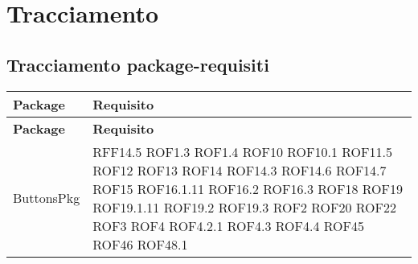 \newpage

\section{Tracciamento}

	\subsection{Tracciamento package-requisiti}
	\def\arraystretch{1.5}
	\begin{longtable}{p{5cm}!{\VRule[1pt]}p{2.5cm}}
		\color{white} \textbf{Package} & \color{white} \textbf{Requisito} \\ 
		\endfirsthead
		\color{white} \textbf{Package} & \color{white} \textbf{Requisito} \\ 
		\endhead
		ButtonsPkg & RFF14.5 \newline ROF1.3 \newline ROF1.4 \newline ROF10 \newline ROF10.1 \newline ROF11.5 \newline ROF12 \newline ROF13 \newline ROF14 \newline ROF14.3 \newline ROF14.6 \newline ROF14.7 \newline ROF15 \newline ROF16.1.11 \newline ROF16.2 \newline ROF16.3 \newline ROF18 \newline ROF19 \newline ROF19.1.11 \newline ROF19.2 \newline ROF19.3 \newline ROF2 \newline ROF20 \newline ROF22 \newline ROF3 \newline ROF4 \newline ROF4.2.1 \newline ROF4.3 \newline ROF4.4 \newline ROF45 \newline ROF46 \newline ROF48.1 \\

\end{longtable}
